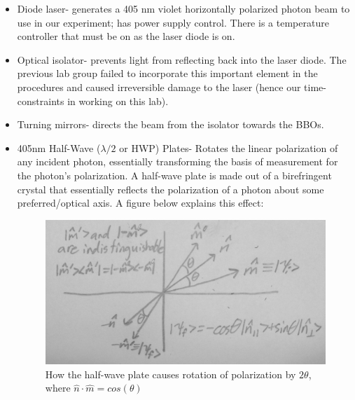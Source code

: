 \documentclass{article}
\begin{document}
    \begin{itemize}
        \item Diode laser- generates a 405 nm violet horizontally polarized photon beam to use in our experiment; has power supply control. There is a temperature controller that must be on as the laser diode is on.
        \item Optical isolator- prevents light from reflecting back into the laser diode. The previous lab group failed to incorporate this important element in the procedures and caused irreversible damage to the laser (hence our time-constraints in working on this lab).
        \item Turning mirrors- directs the beam from the isolator towards the BBOs.
        \item 405nm Half-Wave ($\lambda/2$ or HWP) Plates- Rotates the linear polarization of any incident photon, essentially transforming the basis of measurement for the photon's polarization. A half-wave plate is made out of a birefringent crystal that essentially reflects the polarization of a photon about some preferred/optical axis. A figure below explains this effect:  \cite{qie}
        \begin{figure}[H] %
    \centering
    \includegraphics[scale = 0.15]{3.JPG}
    \caption{How the half-wave plate causes rotation of polarization by $2\theta$, where $\hat{n}\cdot \hat{m}=cos(\theta)$}
    \label{fig:my_label}
\end{figure}

\end{itemize}
\end{document}
